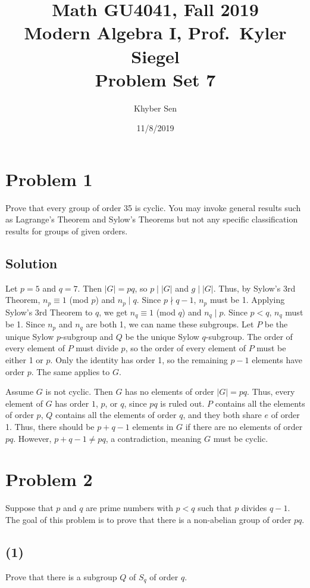 \documentclass[fleqn]{article}
\title{
Math GU4041, Fall 2019 \\
Modern Algebra I, Prof.\ Kyler Siegel \\
Problem Set 7
}
\author{Khyber Sen}
\date{11/8/2019}
\begin{document}
    
    \maketitle
    
    \section{Problem 1}
    Prove that every group of order 35 is cyclic.  You may invoke general results such as Lagrange's Theorem and Sylow's Theorems but not any specific classification results for groups of given orders.
        
        \subsection{Solution}
        Let $p = 5$ and $q = 7$.  Then $|G| = pq$, so $p \mid |G|$ and $g \mid |G|$.  Thus, by Sylow's 3rd Theorem, $n_p \equiv 1$ (mod $p$) and $n_p \mid q$.  Since $p \nmid q - 1$, $n_p$ must be 1.  Applying Sylow's 3rd Theorem to $q$, we get $n_q \equiv 1$ (mod $q$) and $n_q \mid p$.  Since $p < q$, $n_q$ must be 1.  Since $n_p$ and $n_q$ are both 1, we can name these subgroups.  Let $P$ be the unique Sylow $p$-subgroup and $Q$ be the unique Sylow $q$-subgroup.  The order of every element of $P$ must divide $p$, so the order of every element of $P$ must be either 1 or $p$.  Only the identity has order 1, so the remaining $p - 1$ elements have order $p$.  The same applies to $G$.
        
        Assume $G$ is not cyclic.  Then $G$ has no elements of order $|G| = pq$.  Thus, every element of $G$ has order $1$, $p$, or $q$, since $pq$ is ruled out.  $P$ contains all the elements of order $p$, $Q$ contains all the elements of order $q$, and they both share $e$ of order 1.  Thus, there should be $p + q - 1$ elements in $G$ if there are no elements of order $pq$.  However, $p + q - 1 \neq pq$, a contradiction, meaning $G$ must be cyclic.
    
    \section{Problem 2}
    Suppose that $p$ and $q$ are prime numbers with $p < q$ such that $p$ divides $q - 1$.  The goal of this problem is to prove that there is a non-abelian group of order $pq$.
        
        \subsection{(1)}
        Prove that there is a subgroup $Q$ of $S_q$ of order $q$.
            
\end{document}
